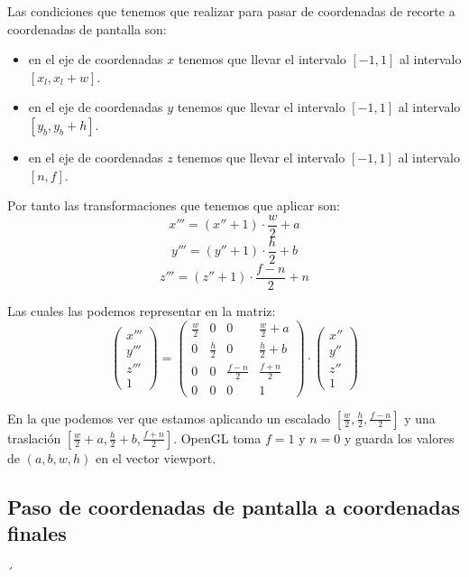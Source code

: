 \documentclass[a4paper,11pt, oneside]{book}
\begin{document}
Las condiciones que tenemos que realizar para pasar de coordenadas de recorte a coordenadas de pantalla son:
\begin{itemize}
	\item en el eje de coordenadas $x$ tenemos que llevar el intervalo $[-1,1]$ al intervalo $[x_l, x_l+w]$.
	\item en el eje de coordenadas $y$ tenemos que llevar el intervalo $[-1,1]$ al intervalo $[y_b, y_b+h]$.
	\item en el eje de coordenadas $z$ tenemos que llevar el intervalo $[-1,1]$ al intervalo $[n, f]$.
\end{itemize}

Por tanto las transformaciones que tenemos que aplicar son:
\begin{equation}
x''' = (x''+1)\cdot \frac{w}{2}+a
\end{equation}
\begin{equation}
y''' = (y''+1)\cdot \frac{h}{2}+b
\end{equation}
\begin{equation}
z''' = (z''+1)\cdot \frac{f-n}{2}+n
\end{equation}

Las cuales las podemos representar en la matriz:
\begin{equation}
\begin{pmatrix}
x'''\\
y'''\\
z'''\\
1
\end{pmatrix} =
\begin{pmatrix}
\frac{w}{2} &0&0&\frac{w}{2}+a\\
0&\frac{h}{2} &0&\frac{h}{2}+b\\
0&0&\frac{f-n}{2} & \frac{f+n}{2}\\
0&0&0&1
\end{pmatrix}
\cdot \begin{pmatrix}
x''\\
y''\\
z''\\
1
\end{pmatrix}
\end{equation}

En la que podemos ver que estamos aplicando un escalado $[\frac{w}{2}, \frac{h}{2}, \frac{f-n}{2}]$ y una traslación $[\frac{w}{2}+a, \frac{h}{2}+b, \frac{f+n}{2}]$. OpenGL toma $f=1$ y $n=0$ y guarda los valores de $(a,b,w,h)$ en el vector viewport. 

\subsection{Paso de coordenadas de pantalla a coordenadas finales}´
\end{document}
